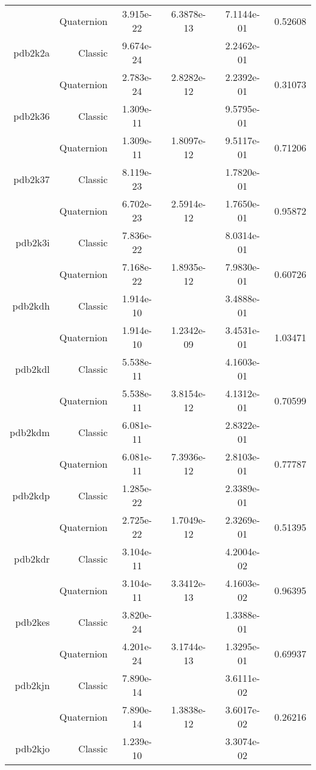 \begin{xltabular}{\textwidth}{r|rS[table-format=1.3e+2]S[table-format=1.4e+2]S[table-format=1.4e+2]S[table-format=-1.5]}
& Quaternion & 3.915e-22 & 6.3878e-13 & 7.1144e-01 & 0.52608\\  \addlinespace
pdb2k2a & Classic & 9.674e-24 &  & 2.2462e-01 & \\
& Quaternion & 2.783e-24 & 2.8282e-12 & 2.2392e-01 & 0.31073\\  \addlinespace
pdb2k36 & Classic & 1.309e-11 &  & 9.5795e-01 & \\
& Quaternion & 1.309e-11 & 1.8097e-12 & 9.5117e-01 & 0.71206\\  \addlinespace
pdb2k37 & Classic & 8.119e-23 &  & 1.7820e-01 & \\
& Quaternion & 6.702e-23 & 2.5914e-12 & 1.7650e-01 & 0.95872\\  \addlinespace
pdb2k3i & Classic & 7.836e-22 &  & 8.0314e-01 & \\
& Quaternion & 7.168e-22 & 1.8935e-12 & 7.9830e-01 & 0.60726\\  \addlinespace
pdb2kdh & Classic & 1.914e-10 &  & 3.4888e-01 & \\
& Quaternion & 1.914e-10 & 1.2342e-09 & 3.4531e-01 & 1.03471\\  \addlinespace
pdb2kdl & Classic & 5.538e-11 &  & 4.1603e-01 & \\
& Quaternion & 5.538e-11 & 3.8154e-12 & 4.1312e-01 & 0.70599\\  \addlinespace
pdb2kdm & Classic & 6.081e-11 &  & 2.8322e-01 & \\
& Quaternion & 6.081e-11 & 7.3936e-12 & 2.8103e-01 & 0.77787\\  \addlinespace
pdb2kdp & Classic & 1.285e-22 &  & 2.3389e-01 & \\
& Quaternion & 2.725e-22 & 1.7049e-12 & 2.3269e-01 & 0.51395\\  \addlinespace
pdb2kdr & Classic & 3.104e-11 &  & 4.2004e-02 & \\
& Quaternion & 3.104e-11 & 3.3412e-13 & 4.1603e-02 & 0.96395\\  \addlinespace
pdb2kes & Classic & 3.820e-24 &  & 1.3388e-01 & \\
& Quaternion & 4.201e-24 & 3.1744e-13 & 1.3295e-01 & 0.69937\\  \addlinespace
pdb2kjn & Classic & 7.890e-14 &  & 3.6111e-02 & \\
& Quaternion & 7.890e-14 & 1.3838e-12 & 3.6017e-02 & 0.26216\\  \addlinespace
pdb2kjo & Classic & 1.239e-10 &  & 3.3074e-02 & \\

\end{xltabular}
